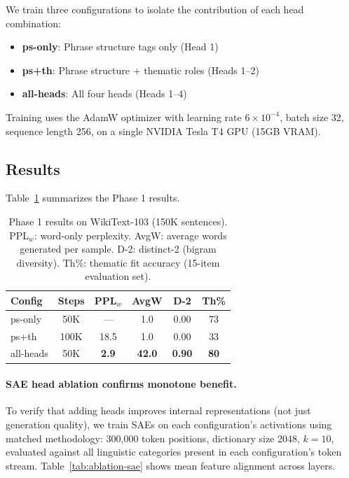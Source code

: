 \documentclass[11pt]{article}
\begin{document}
We train three configurations to isolate the contribution of each 
head combination:

\begin{itemize}
    \item \textbf{ps-only}: Phrase structure tags only (Head 1)
    \item \textbf{ps+th}: Phrase structure + thematic roles (Heads 1--2)
    \item \textbf{all-heads}: All four heads (Heads 1--4)
\end{itemize}

Training uses the AdamW optimizer with learning rate $6 \times 10^{-4}$, 
batch size 32, sequence length 256, on a single NVIDIA Tesla T4 GPU 
(15GB VRAM).

\subsection{Results}

Table~\ref{tab:results} summarizes the Phase 1 results.

\begin{table}[t]
\centering
\small
\begin{tabular}{@{}lccccc@{}}
\toprule
\textbf{Config} & \textbf{Steps} & \textbf{PPL$_w$} & \textbf{AvgW} & \textbf{D-2} & \textbf{Th\%} \\
\midrule
ps-only & 50K & --- & 1.0 & 0.00 & 73 \\
ps+th & 100K & 18.5 & 1.0 & 0.00 & 33 \\
all-heads & 50K & \textbf{2.9} & \textbf{42.0} & \textbf{0.90} & \textbf{80} \\
\bottomrule
\end{tabular}
\caption{Phase 1 results on WikiText-103 (150K sentences). PPL$_w$: 
word-only perplexity. AvgW: average words generated per sample. D-2: 
distinct-2 (bigram diversity). Th\%: thematic fit accuracy (15-item 
evaluation set).}
\label{tab:results}
\end{table}

\paragraph{SAE head ablation confirms monotone benefit.}
\label{para:ablation-sae}
To verify that adding heads improves internal representations (not just 
generation quality), we train SAEs on each configuration's activations 
using matched methodology: 300,000 token positions, dictionary size 2048, 
$k{=}10$, evaluated against all linguistic categories present in each 
configuration's token stream. Table~\ref{tab:ablation-sae} shows mean 
feature alignment across layers.
\end{document}
